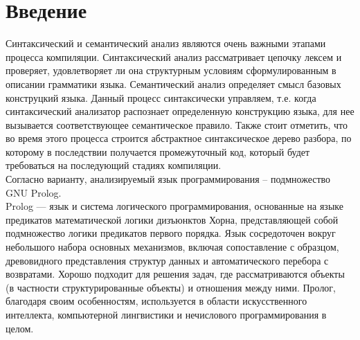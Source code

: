 \documentclass[a4paper,12pt]{article}
\newcommand{\unsection}[1]{\newpage\section*{#1}\addcontentsline{toc}{section}{#1}}
\begin{document}
    \tableofcontents 

    \unsection{Введение}
   
    Синтаксический и семантический анализ являются очень важными этапами процесса компиляции.
	Синтаксический анализ рассматривает цепочку лексем и проверяет, удовлетворяет ли она
	структурным условиям сформулированным в описании грамматики языка.
	Семантический анализ определяет смысл базовых конструцкий языка. Данный процесс синтаксически управляем,
	т.е. когда синтаксический анализатор распознает определенную конструкцию языка, для нее вызывается соответствующее
	семантическое правило. Также стоит отметить, что во время этого процесса строится абстрактное синтаксическое дерево разбора,
	по которому в последствии получается промежуточный код, который будет требоваться на последующий стадиях компиляции.\\
	\indent Согласно варианту, анализируемый язык программирования -- подмножество GNU Prolog.\\
    \indent Prolog — язык и система логического программирования, основанные на языке предикатов математической 
    логики дизъюнктов Хорна, представляющей собой подмножество логики предикатов первого порядка.
    Язык сосредоточен вокруг небольшого набора основных механизмов, включая сопоставление с образцом, древовидного 
    представления структур данных и автоматического перебора с возвратами. Хорошо подходит для решения задач, где 
    рассматриваются объекты (в частности структурированные объекты) и отношения между ними. Пролог, благодаря своим 
    особенностям, используется в области искусственного интеллекта, компьютерной лингвистики и нечислового 
    программирования в целом.
\end{document}
